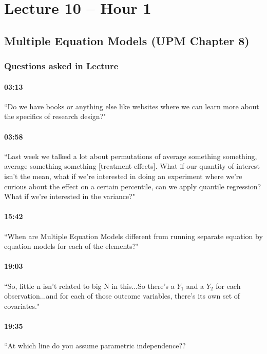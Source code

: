 \documentclass[11pt]{article}
\begin{document}
\section{Lecture 10 -- Hour 1}

\subsection{Multiple Equation Models (UPM Chapter 8)}

\subsubsection{Questions asked in Lecture}

\paragraph{03:13}  ``Do we have books or anything else like websites where we can learn more about the specifics of research design?"

\paragraph{03:58}  ``Last week we talked a lot about permutations of average something something, average something something [treatment effects]. What if our quantity of interest isn't the mean, what if we're interested in doing an experiment where we're curious about the effect on a certain percentile, can we apply quantile regression? What if we're interested in the variance?"

\paragraph{15:42}  ``When are Multiple Equation Models different from running separate equation by equation models for each of the elements?"

\paragraph{19:03} ``So, little n isn't related to big N in this...So there's a $Y_1$ and a $Y_2$ for each observation...and for each of those outcome variables, there's its own set of covariates."

\paragraph{19:35} ``At which line do you assume parametric independence??
\end{document}
